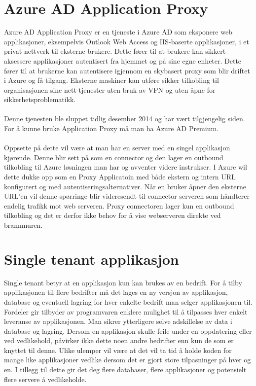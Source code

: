 \section{Azure AD Application Proxy}
\label{sec:teoridel_azure_ad_application_proxy}
Azure AD Application Proxy er en tjeneste i Azure AD som eksponere web applikasjoner, eksempelvis Outlook Web Access og IIS-baserte applikasjoner, i et privat nettverk til eksterne brukere. Dette fører til at brukere kan sikkert aksessere applikasjoner autentisert fra hjemmet og på sine egne enheter. Dette fører til at brukerne kan autentisere igjennom en skybasert proxy som blir driftet i Azure og få tilgang. Eksterne maskiner kan utføre sikker tilkobling til organisasjonen sine nett-tjenester uten bruk av VPN og uten åpne for sikkerhetsproblematikk. \\
\\
Denne tjenesten ble sluppet tidlig desember 2014 og har vært tilgjengelig siden. For å kunne bruke Application Proxy må man ha Azure AD Premium.\\
\\
Oppsette på dette vil være at man har en server med en singel applikasjon kjørende. Denne blir sett på som en connector og den lager en outbound tilkobling til Azure løsningen man har og avventer videre instrukser. I Azure wil dette dukke opp som en Proxy Applicatoin med både ekstern og intern URL konfigurert og med autentiseringsalternativer. Når en bruker åpner den eksterne URL'en vil denne spørringe blir videresendt til connector serveren som håndterer endelig trafikk mot web serveren. Proxy connectoren lager kun en outbound tilkobling og det er derfor ikke behov for å vise webserveren direkte ved brannmuren.

\section*{Single tenant applikasjon}
\label{sec:singleTenantApplikasjon}
Single tenant betyr at en applikasjon kun kan brukes av en bedrift. For å tilby applikasjonen til flere bedrifter må det lages en ny versjon av applikasjon, database og eventuell lagring for hver enkelte bedrift man selger applikasjonen til. Fordeler gir tilbyder av programvaren enklere mulighet til å tilpasses hver enkelt leveranse av applikasjonen. Man sikrer ytterligere selve adskillelse av data i database og lagring. Dersom en applikasjon skulle feile under en oppdatering eller ved vedlikehold, påvirker ikke dette noen andre bedrifter enn kun de som er knyttet til denne. Ulike ulemper vil være at det vil ta tid å holde koden for mange like applikasjoner vedlike dersom det er gjort store tilpasninger på hver og en. I tillegg til dette gir det deg flere databaser, flere applikasjoner og potensielt flere servere å vedlikeholde.

